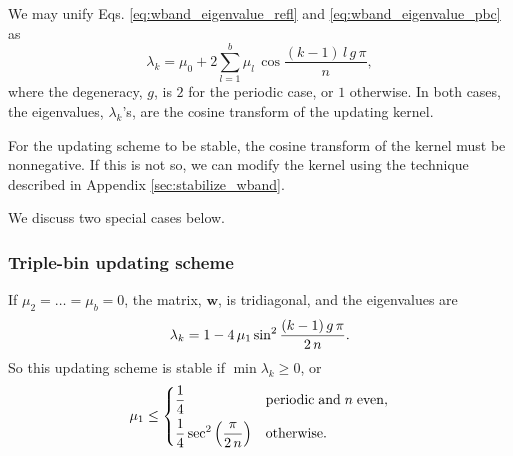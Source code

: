 \documentclass[reprint, superscriptaddress, floatfix]{revtex4-1}
\begin{document}
%
We may unify Eqs. \eqref{eq:wband_eigenvalue_refl}
and \eqref{eq:wband_eigenvalue_pbc} as
%
\begin{equation}
  \lambda_k
  =
  \mu_0
  +
  2
  \sum_{ l = 1 }^b
    \mu_l \,
    \cos \frac{ (k - 1) \, l \, g \, \pi }
              {            n             }
  ,
  \label{eq:wband_eigenvalue}
\end{equation}
%
where the degeneracy, $g$, is $2$
for the periodic case,
or $1$ otherwise.
%
In both cases,
the eigenvalues, $\lambda_k$'s,
are the cosine transform of
the updating kernel.

For the updating scheme to be stable,
the cosine transform of the kernel
must be nonnegative.
%
If this is not so,
we can modify the kernel
using the technique described
in Appendix \ref{sec:stabilize_wband}.

We discuss two special cases below.



\subsubsection{\label{sec:nnscheme}
Triple-bin updating scheme}



If $\mu_2 = \dots = \mu_b = 0$,
the matrix, $\mathbf w$, is tridiagonal,
and the eigenvalues are
\begin{equation}
  \lambda_k
  =
  1 -
  4 \, \mu_1 \sin^2
  \frac{ (k - 1) \, g \, \pi }
       {       2 \, n        }
  .
\notag
\end{equation}
%
So this updating scheme is stable if
$\min \lambda_k \ge 0$,
or
\begin{equation}
  \mu_1 \le
  \begin{dcases}
    \frac 1 4
    & \mathrm{periodic \; and \;} n \mathrm{ \; even,}
    \\
    \frac 1 4
    \sec^2
    \left( \frac{  \pi   }
                { 2 \, n }
    \right)
    & \mathrm{otherwise}.
  \end{dcases}
\notag
\end{equation}
\end{document}
